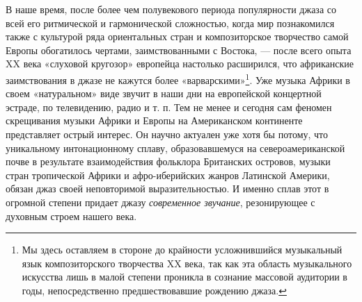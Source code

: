 В  наше  время,  после  более чем  полувекового  периода  популярности
джаза  со  всей  его  ритмической и  гармонической  сложностью,  когда
мир   познакомился  также   с   культурой   ряда  ориентальных   стран
и   композиторское  творчество   самой  Европы   обогатилось  чертами,
заимствованными   с   Востока,   —   после   всего   опыта   XX   века
«слуховой  кругозор» европейца  настолько расширился,  что африканские
заимствования  в  джазе  не  кажутся  более  «варварскими»\footnote{Мы
здесь  оставляем  в  стороне до  крайности  усложнившийся  музыкальный
язык  композиторского   творчества  XX  века,  так   как  эта  область
музыкального  искусства  лишь  в  малой степени  проникла  в  сознание
массовой аудитории  в годы, непосредственно  предшествовавшие рождению
джаза.}. Уже  музыка Африки в  своем «натуральном» виде звучит  в наши
дни на европейской  концертной эстраде, по телевидению, радио  и т. п.
Тем  не  менее и  сегодня  сам  феномен  скрещивания музыки  Африки  и
Европы  на Американском  континенте  представляет  острый интерес.  Он
научно  актуален уже  хотя бы  потому, что  уникальному интонационному
сплаву,  образовавшемуся  на  североамериканской  почве  в  результате
взаимодействия фольклора Британских островов, музыки стран тропической
Африки и  афро-иберийских жанров Латинской Америки,  обязан джаз своей
неповторимой выразительностью. И именно  сплав этот в огромной степени
придает  джазу \emph{современное  звучание},  резонирующее с  духовным
строем нашего века.

